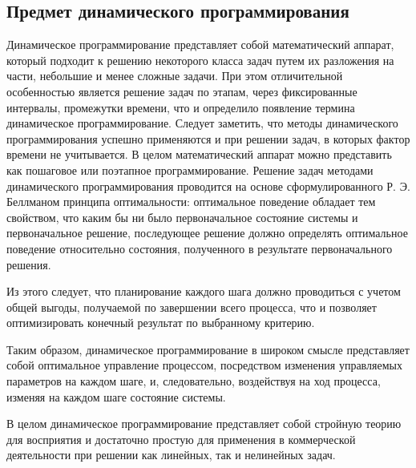 \subsection{Предмет динамического программирования}

Динамическое программирование представляет собой математический аппарат, который подходит к решению некоторого класса задач путем их разложения на части, небольшие и менее сложные задачи. При этом отличительной особенностью является решение задач по этапам, через фиксированные интервалы, промежутки времени, что и определило появление термина динамическое программирование. Следует заметить, что методы динамического программирования успешно применяются и при решении задач, в которых фактор времени не учитывается. В целом математический аппарат можно представить как пошаговое или поэтапное программирование. Решение задач методами динамического программирования проводится на основе сформулированного Р. Э. Беллманом принципа оптимальности: оптимальное поведение обладает тем свойством, что каким бы ни было первоначальное состояние системы и первоначальное решение, последующее решение должно определять оптимальное поведение относительно состояния, полученного в результате первоначального решения.

Из этого следует, что планирование каждого шага должно проводиться с учетом общей выгоды, получаемой по завершении всего процесса, что и позволяет оптимизировать конечный результат по выбранному критерию.

Таким образом, динамическое программирование в широком смысле представляет собой оптимальное управление процессом, посредством изменения управляемых параметров на каждом шаге, и, следовательно, воздействуя на ход процесса, изменяя на каждом шаге состояние системы.

В целом динамическое программирование представляет собой стройную теорию для восприятия и достаточно простую для применения в коммерческой деятельности при решении как линейных, так и нелинейных задач.

